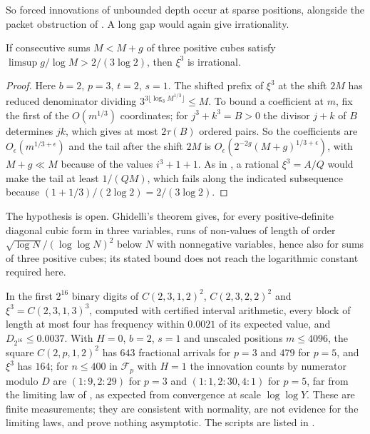 \documentclass[11pt]{article}
\begin{document}
So forced innovations of unbounded depth occur at sparse positions, alongside the packet obstruction of
. A long gap would again give irrationality.

\begin{proposition}\label{prop:cubiccond}
If consecutive sums $M<M+g$ of three positive cubes satisfy $\limsup g/\log M>2/(3\log2)$, then $\xi^3$ is irrational.
\end{proposition}

\begin{proof}
Here $b=2$, $p=3$, $t=2$, $s=1$. The shifted prefix of $\xi^3$ at the shift $2M$ has reduced denominator dividing
$3^{3\lfloor\log_3M^{1/3}\rfloor}\le M$. To bound a coefficient at $m$, fix the first of the $O(m^{1/3})$ coordinates; for
$j^3+k^3=B>0$ the divisor $j+k$ of $B$ determines $jk$, which gives at most $2\tau(B)$ ordered pairs. So the
coefficients are $O_\epsilon(m^{1/3+\epsilon})$ and the tail after the shift $2M$ is $O_\epsilon(2^{-2g}(M+g)^{1/3+\epsilon})$, with
$M+g\ll M$ because of the values $i^3+1+1$. As in , a rational $\xi^3=A/Q$ would make the tail at
least $1/(QM)$, which fails along the indicated subsequence because $(1+1/3)/(2\log2)=2/(3\log2)$.
\end{proof}

The hypothesis is open. Ghidelli's theorem \cite[Theorem~1.1]{Ghidelli20} gives, for every positive-definite
diagonal cubic form in three variables, runs of non-values of length of order $\sqrt{\log N}/(\log\log N)^2$ below $N$
with nonnegative variables, hence also for sums of three positive cubes; its stated bound does not reach the
logarithmic constant required here.

\begin{remark}\label{rem:finitedata}
In the first $2^{16}$ binary digits of $C(2,3,1,2)^2$, $C(2,3,2,2)^2$ and $\xi^3=C(2,3,1,3)^3$, computed with
certified interval arithmetic, every block of length at most four has frequency within $0.0021$ of its
expected value, and $D_{2^{16}}\le0.0037$. With $H=0$, $b=2$, $s=1$ and unscaled positions $m\le4096$, the square
$C(2,p,1,2)^2$ has $643$ fractional arrivals for $p=3$ and $479$ for $p=5$, and $\xi^3$ has $164$; for $n\le400$ in
$\mathcal F_p$ with $H=1$ the innovation counts by numerator modulo $D$ are $(1{:}9,2{:}29)$ for $p=3$ and
$(1{:}1,2{:}30,4{:}1)$ for $p=5$, far from the limiting law of , as expected from convergence
at scale $\log\log Y$. These are finite measurements; they are consistent with normality, are not evidence for
the limiting laws, and prove nothing asymptotic. The scripts are listed in .
\end{remark}
\end{document}
